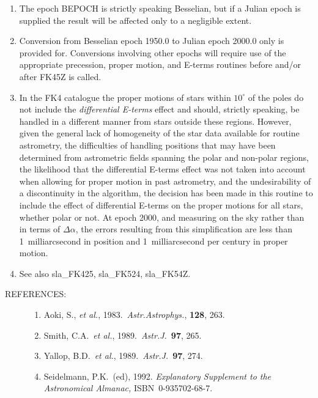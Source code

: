 \documentclass[11pt,twoside,nolof]{starlink}
\renewcommand{\refs}[1]
 {  \begin{description}
     \item[REFERENCES:]
         #1
   \end{description}
}
\begin{document}
{
 \begin{enumerate}
  \item The epoch BEPOCH is strictly speaking Besselian, but
        if a Julian epoch is supplied the result will be
        affected only to a negligible extent.
  \item Conversion from Besselian epoch 1950.0 to Julian epoch
        2000.0 only is provided for.  Conversions involving other
        epochs will require use of the appropriate precession,
        proper motion, and E-terms routines before and/or
        after FK45Z is called.
  \item In the FK4 catalogue the proper motions of stars within
        $10^{\circ}$ of the poles do not include the \textit{differential
        E-terms}\/ effect and should, strictly speaking, be handled
        in a different manner from stars outside these regions.
        However, given the general lack of homogeneity of the star
        data available for routine astrometry, the difficulties of
        handling positions that may have been determined from
        astrometric fields spanning the polar and non-polar regions,
        the likelihood that the differential E-terms effect was not
        taken into account when allowing for proper motion in past
        astrometry, and the undesirability of a discontinuity in
        the algorithm, the decision has been made in this routine to
        include the effect of differential E-terms on the proper
        motions for all stars, whether polar or not.  At epoch 2000,
        and measuring on the sky rather than in terms of $\Delta\alpha$,
        the errors resulting from this simplification are less than
        1~milliarcsecond in position and 1~milliarcsecond per
        century in proper motion.
  \item See also sla\_FK425, sla\_FK524, sla\_FK54Z.
 \end{enumerate}
}
\refs
{
 \begin{enumerate}
  \item Aoki, S., \textit{et al.}, 1983.\ \textit{Astr.Astrophys.}, \textbf{128}, 263.
  \item Smith, C.A.\ \textit{et al.}, 1989.\  \textit{Astr.J.}\ \textbf{97}, 265.
  \item Yallop, B.D.\ \textit{et al.}, 1989.\ \textit{Astr.J.}\ \textbf{97}, 274.
  \item Seidelmann, P.K.\ (ed), 1992.  \textit{Explanatory
        Supplement to the Astronomical Almanac,}\/ ISBN~0-935702-68-7.
 \end{enumerate}
}
\end{document}
